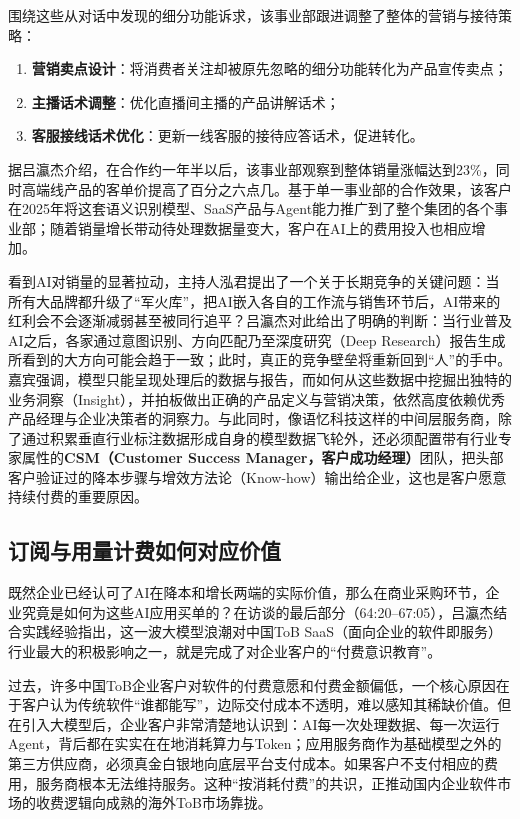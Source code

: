 \documentclass[UTF8,a4paper,11pt,fontset=fandol]{ctexart}
\begin{document}
围绕这些从对话中发现的细分功能诉求，该事业部跟进调整了整体的营销与接待策略：
\begin{enumerate}
\item \textbf{营销卖点设计}：将消费者关注却被原先忽略的细分功能转化为产品宣传卖点；
\item \textbf{主播话术调整}：优化直播间主播的产品讲解话术；
\item \textbf{客服接线话术优化}：更新一线客服的接待应答话术，促进转化。
\end{enumerate}
据吕瀛杰介绍，在合作约一年半以后，该事业部观察到整体销量涨幅达到23\%，同时高端线产品的客单价提高了百分之六点几。基于单一事业部的合作效果，该客户在2025年将这套语义识别模型、SaaS产品与Agent能力推广到了整个集团的各个事业部；随着销量增长带动待处理数据量变大，客户在AI上的费用投入也相应增加。

看到AI对销量的显著拉动，主持人泓君提出了一个关于长期竞争的关键问题：当所有大品牌都升级了“军火库”，把AI嵌入各自的工作流与销售环节后，AI带来的红利会不会逐渐减弱甚至被同行追平？吕瀛杰对此给出了明确的判断：当行业普及AI之后，各家通过意图识别、方向匹配乃至深度研究（Deep Research）报告生成所看到的大方向可能会趋于一致；此时，真正的竞争壁垒将重新回到“人”的手中。嘉宾强调，模型只能呈现处理后的数据与报告，而如何从这些数据中挖掘出独特的业务洞察（Insight），并拍板做出正确的产品定义与营销决策，依然高度依赖优秀产品经理与企业决策者的洞察力。与此同时，像语忆科技这样的中间层服务商，除了通过积累垂直行业标注数据形成自身的模型数据飞轮外，还必须配置带有行业专家属性的\textbf{CSM（Customer Success Manager，客户成功经理）}团队，把头部客户验证过的降本步骤与增效方法论（Know-how）输出给企业，这也是客户愿意持续付费的重要原因。

\subsection{订阅与用量计费如何对应价值}
既然企业已经认可了AI在降本和增长两端的实际价值，那么在商业采购环节，企业究竟是如何为这些AI应用买单的？在访谈的最后部分（64:20–67:05），吕瀛杰结合实践经验指出，这一波大模型浪潮对中国ToB SaaS（面向企业的软件即服务）行业最大的积极影响之一，就是完成了对企业客户的“付费意识教育”。

过去，许多中国ToB企业客户对软件的付费意愿和付费金额偏低，一个核心原因在于客户认为传统软件“谁都能写”，边际交付成本不透明，难以感知其稀缺价值。但在引入大模型后，企业客户非常清楚地认识到：AI每一次处理数据、每一次运行Agent，背后都在实实在在地消耗算力与Token；应用服务商作为基础模型之外的第三方供应商，必须真金白银地向底层平台支付成本。如果客户不支付相应的费用，服务商根本无法维持服务。这种“按消耗付费”的共识，正推动国内企业软件市场的收费逻辑向成熟的海外ToB市场靠拢。
\end{document}
